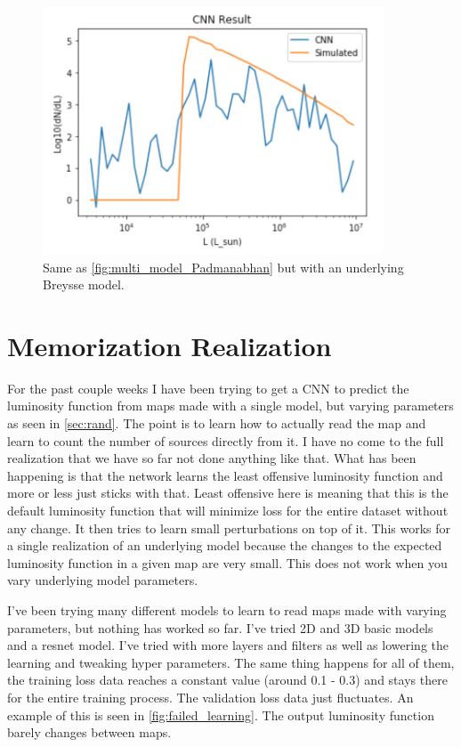 \documentclass{article}
\begin{document}
		\begin{figure}[H]
			\centering
			\includegraphics[width=0.9\textwidth]{multi_model_Breysse.pdf}
			\caption{Same as \cref{fig:multi_model_Padmanabhan} but with an underlying Breysse model.}
			\label{fig:multi_model_Breysse}
		\end{figure}

	\section{Memorization Realization} \label{sec:ohcrap}

		For the past couple weeks I have been trying to get a CNN to predict the luminosity function from maps made with a single model, but varying parameters as seen in \cref{sec:rand}.  The point is to learn how to actually read the map and learn to count the number of sources directly from it.  I have no come to the full realization that we have so far not done anything like that.  What has been happening is that the network learns the least offensive luminosity function and more or less just sticks with that.  Least offensive here is meaning that this is the default luminosity function that will minimize loss for the entire dataset without any change.  It then tries to learn small perturbations on top of it.  This works for a single realization of an underlying model because the changes to the expected luminosity function in a given map are very small.  This does not work when you vary underlying model parameters.

		I've been trying many different models to learn to read maps made with varying parameters, but nothing has worked so far.  I've tried 2D and 3D basic models and a resnet model.  I've tried with more layers and filters as well as lowering the learning and tweaking hyper parameters.  The same thing happens for all of them, the training loss data reaches a constant value (around 0.1 - 0.3) and stays there for the entire training process.  The validation loss data just fluctuates.  An example of this is seen in \cref{fig:failed_learning}.  The output luminosity function barely changes between maps.
\end{document}
